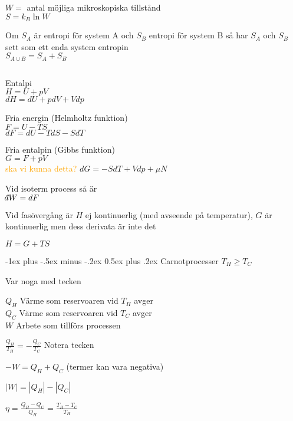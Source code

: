 \documentclass[10pt,landscape]{article}
\makeatletter
\renewcommand{\section}{\@startsection{section}{1}{0mm}%
                                {-1ex plus -.5ex minus -.2ex}%
                                {0.5ex plus .2ex}%
                                {\normalfont\large\bfseries}
                                }
\def\dbar{{\mathchar'26\mkern-12mu d}}
\makeatother
\begin{document}
\begin{multicols}{5}
$W =$ antal möjliga mikroskopiska tillstånd\\
$S = k_B\ln W$

Om $S_A$ är entropi för system A och $S_B$ entropi för system B så har
$S_A$ och $S_B$ sett som ett enda system entropin\\
$S_{A \cup B} = S_A + S_B$

$$$$

Entalpi\\
$H = U + pV$\\
$dH = dU + pdV + Vdp$

Fria energin (Helmholtz funktion)\\
$F = U -TS$\\
$dF = dU - TdS - SdT$

Fria entalpin (Gibbs funktion)\\
$G = F + pV$\\
\textcolor{orange}{ska vi kunna detta?}
$dG = -SdT + Vdp + \mu N$

$$$$
Vid isoterm process så är\\
$\dbar W = dF$

Vid fasövergång är $H$ ej kontinuerlig (med avseende på temperatur), $G$ är kontinuerlig men dess derivata är inte det

$H = G + TS$

\section{Carnotprocesser}
$T_H \ge T_C$

Var noga med tecken

$Q_H$ Värme som reservoaren vid $T_H$ avger\\
$Q_C$ Värme som reservoaren vid $T_C$ avger\\
$W$ Arbete som tillförs processen

$\frac{Q_H}{T_H} = -\frac{Q_C}{T_C}$ \hfill Notera tecken

$-W = Q_H + Q_C$ {\tiny(termer kan vara negativa)}

$|W| = |Q_H| - |Q_C|$


$\eta = \frac{Q_H - Q_C}{Q_H} = \frac{T_H - T_C}{T_H}$

\end{multicols}

\end{document}
